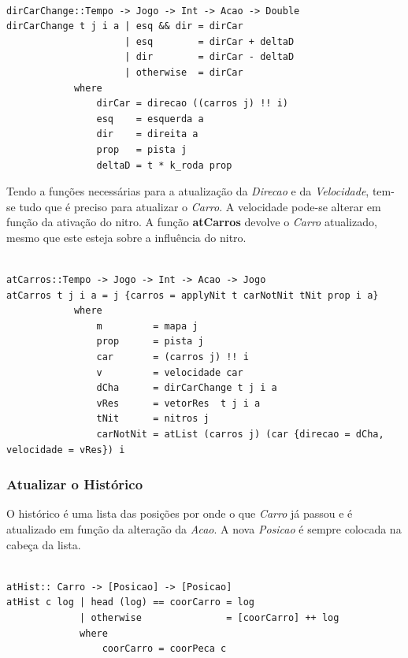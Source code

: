 \documentclass[a4paper]{report} %
\begin{document}
\scriptsize

\begin{verbatim}

dirCarChange::Tempo -> Jogo -> Int -> Acao -> Double
dirCarChange t j i a | esq && dir = dirCar
                     | esq        = dirCar + deltaD
                     | dir        = dirCar - deltaD
                     | otherwise  = dirCar
            where
                dirCar = direcao ((carros j) !! i)
                esq    = esquerda a
                dir    = direita a
                prop   = pista j 
                deltaD = t * k_roda prop

\end{verbatim}

\normalsize

Tendo a funções necessárias para a atualização da \emph{Direcao} e da \emph{Velocidade}, tem-se tudo que é preciso para atualizar o \emph{Carro}.
A velocidade pode-se alterar em função da ativação do nitro.
A função \textbf{atCarros} devolve o \emph{Carro} atualizado, mesmo que este esteja sobre a influência do nitro.

\scriptsize

\begin{verbatim}

atCarros::Tempo -> Jogo -> Int -> Acao -> Jogo
atCarros t j i a = j {carros = applyNit t carNotNit tNit prop i a}
            where
                m         = mapa j
                prop      = pista j
                car       = (carros j) !! i
                v         = velocidade car
                dCha      = dirCarChange t j i a
                vRes      = vetorRes  t j i a
                tNit      = nitros j
                carNotNit = atList (carros j) (car {direcao = dCha, velocidade = vRes}) i

\end{verbatim}

\newpage

\normalsize

\subsubsection{Atualizar o Histórico}

O histórico é uma lista das posições por onde o que \emph{Carro} já passou e é atualizado em função da alteração da \emph{Acao}. A nova \emph{Posicao} é sempre colocada na cabeça da lista.

\begin{verbatim}

atHist:: Carro -> [Posicao] -> [Posicao]
atHist c log | head (log) == coorCarro = log
             | otherwise               = [coorCarro] ++ log
             where
                 coorCarro = coorPeca c

\end{verbatim}
\end{document}

